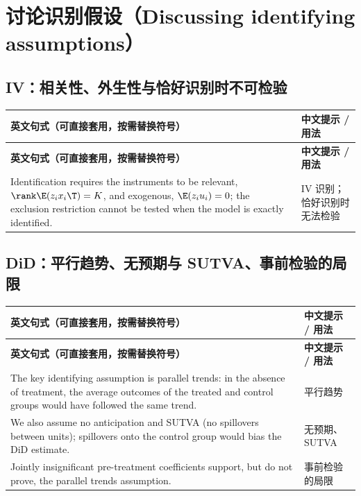 \section{讨论识别假设（Discussing identifying assumptions）}\label{sec:UappC-ident}

\subsection{IV：相关性、外生性与恰好识别时不可检验}

{\renewcommand{\arraystretch}{1.15}\begin{longtable}{@{}>{\raggedright\arraybackslash}p{11.4cm}>{\raggedright\arraybackslash\small}p{4.3cm}@{}}
\toprule
\textbf{英文句式（可直接套用，按需替换符号）} & \textbf{中文提示 / 用法}\\
\midrule
\endfirsthead
\toprule
\textbf{英文句式（可直接套用，按需替换符号）} & \textbf{中文提示 / 用法}\\
\midrule
\endhead
\bottomrule
\endlastfoot
Identification requires the instruments to be relevant, $\rank\E(z_ix_i\T)=K$, and exogenous, $\E(z_iu_i)=0$; the exclusion restriction cannot be tested when the model is exactly identified. & IV 识别；恰好识别时无法检验\\
\end{longtable}}


\subsection{DiD：平行趋势、无预期与 SUTVA、事前检验的局限}

{\renewcommand{\arraystretch}{1.15}\begin{longtable}{@{}>{\raggedright\arraybackslash}p{11.4cm}>{\raggedright\arraybackslash\small}p{4.3cm}@{}}
\toprule
\textbf{英文句式（可直接套用，按需替换符号）} & \textbf{中文提示 / 用法}\\
\midrule
\endfirsthead
\toprule
\textbf{英文句式（可直接套用，按需替换符号）} & \textbf{中文提示 / 用法}\\
\midrule
\endhead
\bottomrule
\endlastfoot
The key identifying assumption is parallel trends: in the absence of treatment, the average outcomes of the treated and control groups would have followed the same trend. & 平行趋势\\
\addlinespace[2pt]
We also assume no anticipation and SUTVA (no spillovers between units); spillovers onto the control group would bias the DiD estimate. & 无预期、SUTVA\\
\addlinespace[2pt]
Jointly insignificant pre-treatment coefficients support, but do not prove, the parallel trends assumption. & 事前检验的局限\\
\end{longtable}}


